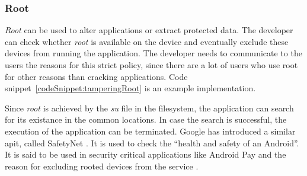 \subsubsection{Root} \label{subsection:counter-improve-tampering-root}
\textit{Root} can be used to alter applications or extract protected data.
The developer can check whether \textit{root} is available on the device and eventually exclude these devices from running the application.
The developer needs to communicate to the users the reasons for this strict policy, since there are a lot of users who use root for other reasons than cracking applications.
Code snippet~\ref{codeSnippet:tamperingRoot} is an example implementation.
\newline

Since \textit{root} is achieved by the \textit{su} file in the filesystem, the application can search for its existance in the common locations.
In case the search is successful, the execution of the application can be terminated.
\newline
Google has introduced a similar \gls{api}t, called SafetyNet \cite{safetynetGoogle}.
It is used to check the “health and safety of an Android”\cite{safetynetDev}.
It is said to be used in security critical applications like Android Pay and the reason for excluding rooted devices from the service \cite{safetynetGoogle} \cite{safetynetPay} \cite{safetynetPayx}.
